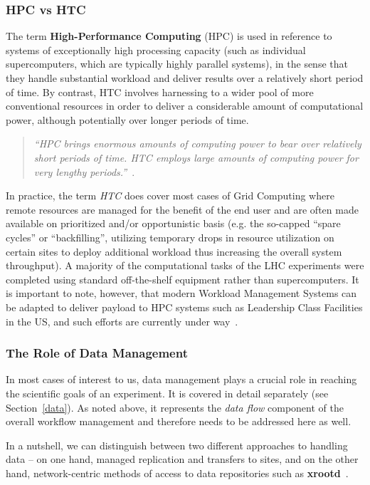 \subsubsection{HPC vs HTC}
The term \textbf{High-Performance Computing} (HPC) is used in reference to systems of exceptionally high processing capacity (such as individual supercomputers, which are typically highly parallel systems),
in the sense that they handle substantial workload and deliver results over a relatively short period of time. By contrast, HTC involves harnessing to a wider pool
of more conventional resources in order to deliver a considerable amount of computational power, although potentially over longer periods of time. 
\begin{quote}
\textit{``HPC brings enormous amounts of computing power to bear over relatively short periods of time. HTC employs large amounts of computing power for very lengthy periods.''}~\cite{htc}.
\end{quote}

In practice, the term \textit{HTC} does cover most cases of Grid Computing where remote resources are managed for the benefit of the end user and are often made available on prioritized and/or
opportunistic basis (e.g. the so-capped ``spare cycles'' or ``backfilling'', utilizing temporary drops in resource utilization on certain sites to deploy additional workload thus increasing the overall system
throughput). A majority of the computational tasks of the LHC experiments were completed using standard off-the-shelf equipment rather than supercomputers. It is important to note, however,
that modern Workload Management Systems can be adapted to deliver payload to HPC systems such as Leadership Class Facilities in the US, and such efforts are currently under way~\cite{panda_chep13}.

\subsubsection{The Role of Data Management}
In most cases of interest to us, data management plays a crucial role in reaching the scientific goals of an experiment. It is covered in detail separately (see Section~\ref{data}).
As noted above, it represents the \textit{data flow} component of the overall workflow management and therefore needs to be addressed here as well.

In a nutshell, we can distinguish between two different approaches to handling data -- on one hand, managed replication and transfers to sites, and on the other hand, network-centric
methods of access to data repositories such as \textbf{xrootd}~\cite{xrootd,xrootd_web}.

